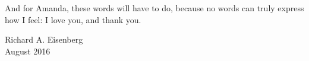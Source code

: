 And for Amanda, these words will have to do, because no words can
truly express how I feel: I love you, and thank you.

\begin{flushright}
Richard A. Eisenberg\\
August 2016
\end{flushright}

